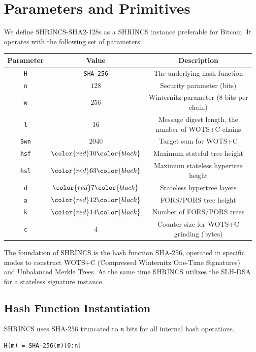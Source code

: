 \section{Parameters and Primitives}

We define SHRINCS-SHA2-128s as a SHRINCS instance preferable for Bitcoin. It operates with the 
following set of parameters:

\begin{center}
\begin{tabular}{ c c c }
 Parameter & Value & Description \\ 
 \hline
 \texttt{H} & \texttt{SHA-256} & The underlying hash function \\ 
 \texttt{n} & $128$ & Security parameter (bits) \\  
 \texttt{w} & $256$ & Winternitz parameter (8 bits per chain) \\
 \texttt{l}  & $16$ & Message digest length, the number of WOTS+C chains \\
 \texttt{Swn} & $2040$ & Target sum for WOTS+C \\
 \texttt{hsf} & $\color{red}10\color{black}$ & Maximum stateful tree height \\
 \texttt{hsl} & $\color{red}63\color{black}$ & Maximum stateless hypertree height \\
 \texttt{d} & $\color{red}7\color{black}$ & Stateless hypertree layers \\
 \texttt{a} & $\color{red}12\color{black}$ & FORS/PORS tree height \\
 \texttt{k} & $\color{red}14\color{black}$ & Number of FORS/PORS trees \\
 \texttt{c} & $4$ & Counter size for WOTS+C grinding (bytes) \\ 
\end{tabular}
\end{center}

The foundation of SHRINCS is the hash function SHA-256, operated in specific modes to construct 
WOTS+C (Compressed Winternitz One-Time Signatures) and Unbalanced Merkle Trees. At the same time
SHRINCS utilizes the SLH-DSA for a stateless signature instance. 

\subsection{Hash Function Instantiation}

SHRINCS uses SHA-256 truncated to \texttt{n} bits for all internal hash operations. 
\begin{center}
\texttt{H(m) = SHA-256(m)[0:n]}
\end{center}

